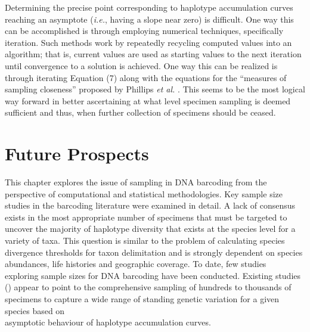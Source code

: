 Determining the precise point corresponding to haplotype accumulation curves \\ reaching an asymptote (\textit{i.e.}, having a slope near zero) is difficult. One way this can be accomplished is through employing numerical techniques, specifically iteration. Such methods work by repeatedly recycling computed values into an algorithm; that is, current values are used as starting values to the next iteration until convergence to a solution is achieved. One way this can be realized is through iterating Equation (7) along with the equations for the ``measures of sampling closeness'' proposed by Phillips \textit{et al.} \cite{phillips2015exploration}. This seems to be the most logical way forward in better ascertaining at what level specimen sampling is deemed sufficient and thus, when further collection of specimens should be ceased.

\section{Future Prospects}

This chapter explores the issue of sampling in DNA barcoding from the perspective of computational and statistical methodologies. Key sample size studies in the barcoding literature were examined in detail. A lack of consensus exists in the most appropriate number of specimens that must be targeted to uncover the majority of haplotype diversity that exists at the species level for a variety of taxa. This question is similar to the problem of calculating species divergence thresholds for taxon delimitation and is strongly dependent on species abundances, life histories and geographic coverage. To date, few studies \\ exploring sample sizes for DNA barcoding have been conducted. Existing studies (\cite{phillips2015exploration, zhang2010estimating}) appear to point to the comprehensive sampling of hundreds to thousands of specimens to capture a wide range of standing genetic variation for a given species based on \\ asymptotic behaviour of haplotype accumulation curves.

